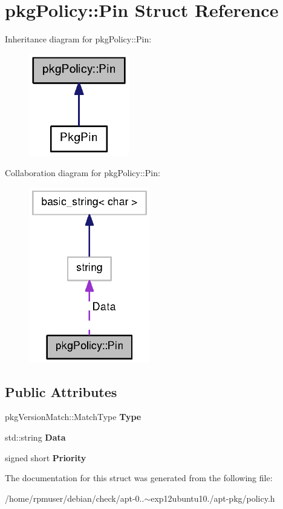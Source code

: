 \section{pkg\-Policy\-:\-:\-Pin \-Struct \-Reference}
\label{structpkgPolicy_1_1Pin}


\-Inheritance diagram for pkg\-Policy\-:\-:\-Pin\-:
\nopagebreak
\begin{figure}[H]
\begin{center}
\leavevmode
\includegraphics[width=124pt]{structpkgPolicy_1_1Pin__inherit__graph}
\end{center}
\end{figure}


\-Collaboration diagram for pkg\-Policy\-:\-:\-Pin\-:
\nopagebreak
\begin{figure}[H]
\begin{center}
\leavevmode
\includegraphics[width=150pt]{structpkgPolicy_1_1Pin__coll__graph}
\end{center}
\end{figure}
\subsection*{\-Public \-Attributes}
\begin{DoxyCompactItemize}
\item 
pkg\-Version\-Match\-::\-Match\-Type {\bfseries \-Type}\label{structpkgPolicy_1_1Pin_a572ae16d2249ef86abebb9a6bab60488}

\item 
std\-::string {\bfseries \-Data}\label{structpkgPolicy_1_1Pin_a25fcab7ba85ce007c5bd4fe39bbe7f6f}

\item 
signed short {\bfseries \-Priority}\label{structpkgPolicy_1_1Pin_a23bcec9c69f6a284c4e030165ccdac55}

\end{DoxyCompactItemize}


\-The documentation for this struct was generated from the following file\-:\begin{DoxyCompactItemize}
\item 
/home/rpmuser/debian/check/apt-\/0..$\sim$exp12ubuntu10./apt-\/pkg/policy.\-h\end{DoxyCompactItemize}
